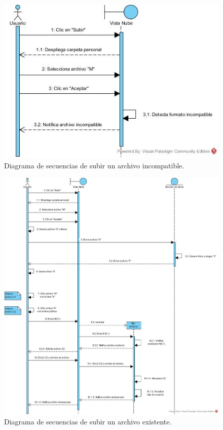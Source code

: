 \begin{figure}[htbp!]
\centering
\includegraphics[width=1\textwidth]{images/Subir_trayectoria_b}
\caption{Diagrama de secuencias de subir un archivo incompatible.}
\end{figure}

\begin{figure}[htbp!]
\centering
\includegraphics[width=1\textwidth]{images/Subir_trayectoria_c}
\caption{Diagrama de secuencias de subir un archivo existente.}
\end{figure} 
\newpage

